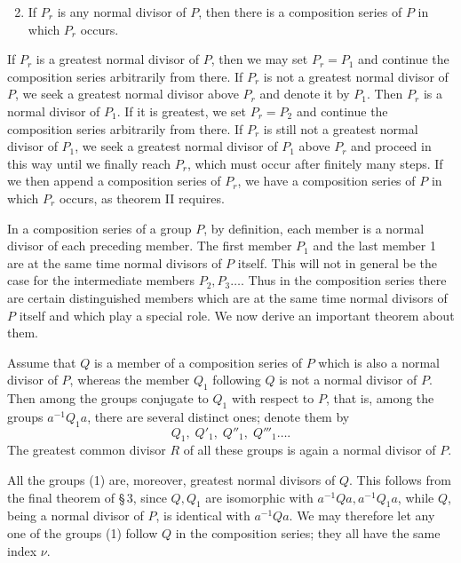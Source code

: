 \documentclass[11pt]{article}
\begin{document}
\begin{enumerate}[label=\Roman*.]
\setcounter{enumi}{1}
\item If $P_r$ is any normal divisor of $P$, then there is a composition series of $P$ in which $P_r$ occurs.
\end{enumerate}

If $P_r$ is a greatest normal divisor of $P$, then we may set $P_r=P_1$ and continue the composition series arbitrarily from there. If $P_r$ is not a greatest normal divisor of $P$, we seek a greatest normal divisor above $P_r$ and denote it by $P_1$. Then $P_r$ is a normal divisor of $P_1$. If it is greatest, we set $P_r=P_2$ and continue the composition series arbitrarily from there. If $P_r$ is still not a greatest normal divisor of $P_1$, we seek a greatest normal divisor of $P_1$ above $P_r$ and proceed in this way until we finally reach $P_r$, which must occur after finitely many steps. If we then append a composition series of $P_r$, we have a composition series of $P$ in which $P_r$ occurs, as theorem II requires.

In a composition series of a group $P$, by definition, each member is a normal divisor of each preceding member. The first member $P_1$ and the last member 1 are at the same time normal divisors of $P$ itself. This will not in general be the case for the intermediate members $P_2,P_3\ldots$. Thus in the composition series there are certain distinguished members which are at the same time normal divisors of $P$ itself and which play a special role. We now derive an important theorem about them.

Assume that $Q$ is a member of a composition series of $P$ which is also a normal divisor of $P$, whereas the member $Q_1$ following $Q$ is not a normal divisor of $P$. Then among the groups conjugate to $Q_1$ with respect to $P$, that is, among the groups $a^{-1}Q_1a$, there are several distinct ones; denote them by
\begin{equation}
Q_1,\;Q'_1,\;Q''_1,\;Q'''_1\ldots.
\tag{1}
\end{equation}
The greatest common divisor $R$ of all these groups is again a normal divisor of $P$.

All the groups (1) are, moreover, greatest normal divisors of $Q$. This follows from the final theorem of \S\,3, since $Q,Q_1$ are isomorphic with $a^{-1}Qa,a^{-1}Q_1a$, while $Q$, being a normal divisor of $P$, is identical with $a^{-1}Qa$. We may therefore let any one of the groups (1) follow $Q$ in the composition series; they all have the same index $\nu$.
\end{document}
